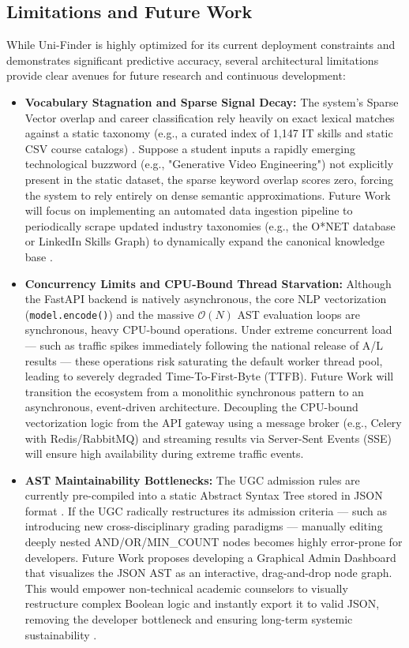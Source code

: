 \documentclass[conference]{IEEEtran}
\begin{document}
\subsection{Limitations and Future Work}
While Uni-Finder is highly optimized for its current deployment constraints and demonstrates significant predictive accuracy, several architectural limitations provide clear avenues for future research and continuous development:
\begin{itemize}
    \item \textbf{Vocabulary Stagnation and Sparse Signal Decay:} The system's Sparse Vector overlap and career classification rely heavily on exact lexical matches against a static taxonomy (e.g., a curated index of 1,147 IT skills and static CSV course catalogs) \cite{almadani2023recommender, silva2026systematic}. Suppose a student inputs a rapidly emerging technological buzzword (e.g., "Generative Video Engineering") not explicitly present in the static dataset, the sparse keyword overlap scores zero, forcing the system to rely entirely on dense semantic approximations. Future Work will focus on implementing an automated data ingestion pipeline to periodically scrape updated industry taxonomies (e.g., the O*NET database or LinkedIn Skills Graph) to dynamically expand the canonical knowledge base \cite{kardan2024conceptualisation}.
    \item \textbf{Concurrency Limits and CPU-Bound Thread Starvation:} Although the FastAPI backend is natively asynchronous, the core NLP vectorization (\texttt{model.encode()}) and the massive $\mathcal{O}(N)$ AST evaluation loops are synchronous, heavy CPU-bound operations. Under extreme concurrent load — such as traffic spikes immediately following the national release of A/L results — these operations risk saturating the default worker thread pool, leading to severely degraded Time-To-First-Byte (TTFB). Future Work will transition the ecosystem from a monolithic synchronous pattern to an asynchronous, event-driven architecture. Decoupling the CPU-bound vectorization logic from the API gateway using a message broker (e.g., Celery with Redis/RabbitMQ) and streaming results via Server-Sent Events (SSE) will ensure high availability during extreme traffic events.
    \item \textbf{AST Maintainability Bottlenecks:} The UGC admission rules are currently pre-compiled into a static Abstract Syntax Tree stored in JSON format \cite{ugc2024overview}. If the UGC radically restructures its admission criteria — such as introducing new cross-disciplinary grading paradigms — manually editing deeply nested AND/OR/MIN\_COUNT nodes becomes highly error-prone for developers. Future Work proposes developing a Graphical Admin Dashboard that visualizes the JSON AST as an interactive, drag-and-drop node graph. This would empower non-technical academic counselors to visually restructure complex Boolean logic and instantly export it to valid JSON, removing the developer bottleneck and ensuring long-term systemic sustainability \cite{vozniuk2025teacher}.
\end{itemize}



\end{document}
